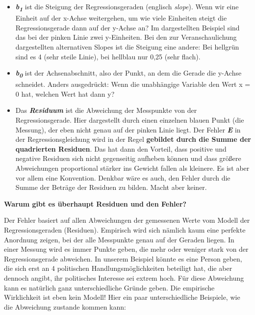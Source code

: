\documentclass[
]{book}
\begin{document}
\begin{itemize}
\item
  \textbf{\emph{b\textsubscript{1}}} ist die Steigung der Regressionsgeraden (englisch \emph{slope}). Wenn wir eine Einheit auf der x-Achse weitergehen, um wie viele Einheiten steigt die Regressionsgerade dann auf der y-Achse an? Im dargestellten Beispiel sind das bei der pinken Linie zwei y-Einheiten. Bei den zur Veranschaulichung dargestellten alternativen Slopes ist die Steigung eine andere: Bei hellgrün sind es 4 (sehr steile Linie), bei hellblau nur 0,25 (sehr flach).
\item
  \textbf{\emph{b\textsubscript{0}}} ist der Achsenabschnitt, also der Punkt, an dem die Gerade die y-Achse schneidet. Anders ausgedrückt: Wenn die unabhängige Variable den Wert x = 0 hat, welchen Wert hat dann y?
\item
  Das \textbf{\emph{Residuum}} ist die Abweichung der Messpunkte von der Regressionsgerade. Hier dargestellt durch einen einzelnen blauen Punkt (die Messung), der eben nicht genau auf der pinken Linie liegt. Der Fehler \textbf{\emph{E}} in der Regressionsgleichung wird in der Regel \textbf{gebildet durch die Summe der quadrierten Residuen}. Das hat dann den Vorteil, dass positive und negative Residuen sich nicht gegenseitig aufheben können und dass größere Abweichungen proportional stärker ins Gewicht fallen als kleinere. Es ist aber vor allem eine Konvention. Denkbar wäre es auch, den Fehler durch die Summe der Beträge der Residuen zu bilden. Macht aber keiner.
\end{itemize}

\leavevmode\hypertarget{info_e}{}%
\textbf{Warum gibt es überhaupt Residuen und den Fehler?}

Der Fehler basiert auf allen Abweichungen der gemessenen Werte vom Modell der Regressionsgeraden (Residuen). Empirisch wird sich nämlich kaum eine perfekte Anordnung zeigen, bei der alle Messpunkte genau auf der Geraden liegen. In einer Messung wird es immer Punkte geben, die mehr oder weniger stark von der Regressionsgerade abweichen. In unserem Beispiel könnte es eine Person geben, die sich erst an 4 politischen Handlungsmöglichkeiten beteiligt hat, die aber dennoch angibt, ihr politisches Interesse sei extrem hoch. Für diese Abweichung kann es natürlich ganz unterschiedliche Gründe geben. Die empirische Wirklichkeit ist eben kein Modell! Hier ein paar unterschiedliche Beispiele, wie die Abweichung zustande kommen kann:
\end{document}
